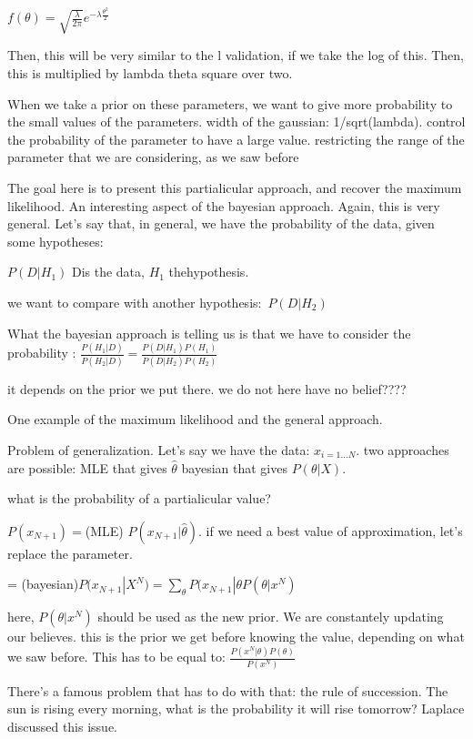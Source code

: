 $f(\theta)  = \sqrt{\frac{\lambda}{2\pi}} e^{-\lambda \frac{\theta^2}{2}}$

Then, this will be very similar to the l validation, if we take the log of this.
Then, this is multiplied by lambda theta square over two.

When we take a prior on these parameters, we want to give more probability to
the small values of the parameters. width of the gaussian: 1/sqrt(lambda).
control the probability of the parameter to have a large value.
restricting the range of the parameter that we are considering, as we saw before

The goal here is to present this partialicular approach, and recover the maximum
likelihood.
An interesting aspect of the bayesian approach. Again, this is very general.
Let's say that, in general, we have the probability of the data, given some
hypotheses:

$P(D|H_1)$
Dis the data, $H_1$ thehypothesis.

we want to compare with another hypothesis: $P(D|H_2)$

What the bayesian approach is telling us is that we have to consider the
probability :
$\frac{P(H_1|D)}{P(H_2|D)} = \frac{P(D|H_1)P(H_1)}{P(D|H_2)P(H_2)}$

it depends on the prior we put there. we do not here have no belief????

One example of the maximum likelihood and the general approach.

Problem of generalization.
Let's say we have the data:
$x_{i=1\ldots N}$. two approaches are possible:
MLE that gives $\hat\theta$
bayesian that gives $P(\theta|X)$.

what is the probability of a partialicular value?

$P(x_{N+1}) = $(MLE) $P(x_{N+1}|\hat\theta)$. if we need a best value of
approximation, let's replace the parameter.

= (bayesian)$ P(x_{N+1} | X^N) = \sum_\theta P(x_{N+1}|\theta P(\theta |x^N)$

here, $P(\theta |x^N)$ should be used as the new prior. We are constantely
updating our believes. this is the prior we get before knowing the
value,
depending on what we saw before. This has to be equal to:
$\frac{P(x^N|\theta)P(\theta)}{P(x^N)}$

There's a famous problem that has to do with that: the rule of succession.
The sun is rising every morning, what is the probability it will rise tomorrow?
Laplace discussed this issue.

